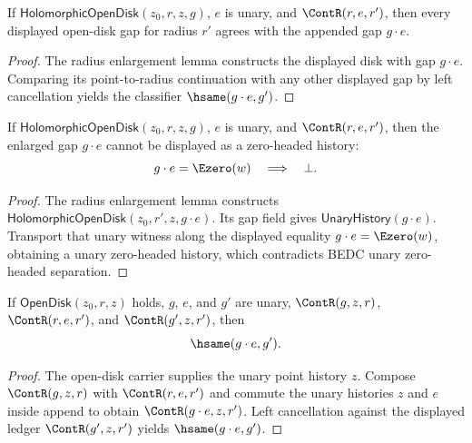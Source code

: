 \begin{theorem}
\label{thm:holo-open-disk-radius-extension-gap-deterministic}
If \(\mathsf{HolomorphicOpenDisk}(z_0,r,z,g)\), \(e\) is unary, and
\(\ContR(r,e,r')\), then every displayed open-disk gap for radius \(r'\)
agrees with the appended gap \(g\cdot e\).
\end{theorem}
\begin{proof}
The radius enlargement lemma constructs the displayed disk with gap
\(g\cdot e\). Comparing its point-to-radius continuation with any other
displayed gap by left cancellation yields the classifier
\(\hsame(g\cdot e,g')\).
\end{proof}

\begin{theorem}
\label{thm:holomorphic-open-disk-radius-extension-gap-zero-headed-absurd}
If \(\mathsf{HolomorphicOpenDisk}(z_0,r,z,g)\), \(e\) is unary, and
\(\ContR(r,e,r')\), then the enlarged gap \(g\cdot e\) cannot be displayed as a
zero-headed history:
$$
g\cdot e=\Ezero(w)\quad\Longrightarrow\quad \bot.
$$
\end{theorem}
\begin{proof}
The radius enlargement lemma constructs
\(\mathsf{HolomorphicOpenDisk}(z_0,r',z,g\cdot e)\). Its gap field gives
\(\mathsf{UnaryHistory}(g\cdot e)\). Transport that unary witness along the
displayed equality \(g\cdot e=\Ezero(w)\), obtaining a unary zero-headed
history, which contradicts BEDC unary zero-headed separation.
\end{proof}

\begin{theorem}
\label{thm:open-disk-radius-extension-gap-deterministic}
If $\mathsf{OpenDisk}(z_0,r,z)$ holds, $g$, $e$, and $g'$ are unary,
$\ContR(g,z,r)$, $\ContR(r,e,r')$, and $\ContR(g',z,r')$, then
$$
\hsame(g\cdot e,g').
$$
\end{theorem}
\begin{proof}
The open-disk carrier supplies the unary point history $z$. Compose
$\ContR(g,z,r)$ with $\ContR(r,e,r')$ and commute the unary histories $z$ and
$e$ inside append to obtain $\ContR(g\cdot e,z,r')$. Left cancellation against
the displayed ledger $\ContR(g',z,r')$ yields $\hsame(g\cdot e,g')$.
\end{proof}

